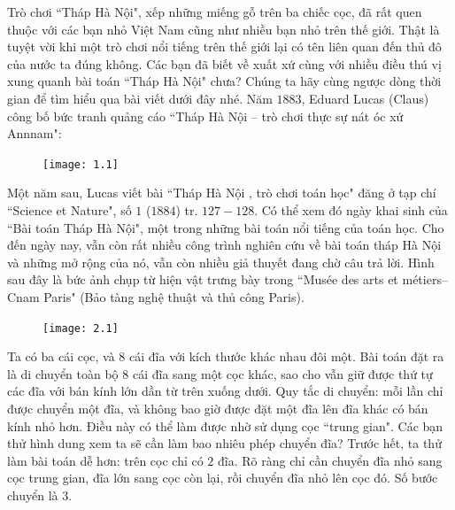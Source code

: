 \begin{multicols}{2}
	Trò chơi ``Tháp Hà Nội", xếp những miếng gỗ trên ba chiếc cọc, đã rất quen thuộc với các bạn nhỏ Việt Nam cũng như nhiều bạn nhỏ trên thế giới. Thật là tuyệt vời khi một trò chơi nổi tiếng trên thế giới lại có tên liên quan đến thủ đô của nước ta đúng không. Các bạn đã biết về xuất xứ cùng với nhiều điều thú vị xung quanh bài toán ``Tháp Hà Nội" chưa? Chúng ta hãy cùng ngược dòng thời gian để tìm hiểu qua bài viết dưới đây nhé.
	\vskip 0.1cm
	Năm $1883$, Eduard Lucas (Claus) công bố  bức tranh quảng cáo ``Tháp Hà Nội --  trò chơi thực sự nát óc xứ Annnam":
	\begin{figure}[H]
		\centering
		\vspace*{-5pt}
		\captionsetup{labelformat= empty, justification=centering}
		\texttt{[image: 1.1]}
		\vspace*{-15pt}
	\end{figure}
	Một năm sau, Lucas viết bài ``Tháp Hà Nội , trò chơi toán học" đăng ở tạp chí ``Science et Nature", số $1$ ($1884$) tr. $127-128$. Có thể xem đó ngày khai sinh của ``Bài toán Tháp Hà Nội", một trong những bài toán nổi tiếng của toán học. Cho đến ngày nay, vẫn còn rất nhiều công trình nghiên cứu về bài toán tháp Hà Nội và những mở rộng của nó, vẫn còn nhiều giả thuyết đang chờ câu trả lời.
	\vskip 0.1cm
	Hình sau đây là bức ảnh chụp từ hiện vật trưng bày trong ``Musée des arts et métiers--Cnam Paris" (Bảo tàng nghệ thuật và thủ công Paris). 
	\begin{figure}[H]
		\centering
		\vspace*{-5pt}
		\captionsetup{labelformat= empty, justification=centering}
		\texttt{[image: 2.1]}
		\vspace*{-15pt} 
	\end{figure}
	Ta có ba cái cọc, và  $8$ cái đĩa với kích thước khác nhau đôi một. Bài toán đặt ra là di chuyển toàn bộ $8$ cái đĩa sang một cọc khác, sao cho vẫn giữ được thứ tự các đĩa với bán kính lớn dần từ trên xuống dưới. Quy tắc di chuyển: mỗi lần chỉ được chuyển một đĩa, và không bao giờ được đặt một đĩa lên đĩa khác có bán kính nhỏ hơn. Điều này có thể làm được nhờ sử dụng cọc ``trung gian".
	\vskip 0.1cm
	Các bạn thử hình dung xem ta sẽ cần làm bao nhiêu phép chuyển đĩa?
	\vskip 0.1cm
	Trước hết, ta thử làm bài toán dễ hơn: trên cọc chỉ có $2$ đĩa. Rõ ràng chỉ cần chuyển đĩa nhỏ sang cọc trung gian, đĩa lớn sang cọc còn lại, rồi chuyển đĩa nhỏ lên cọc đó. Số bước chuyển là $3$.

\end{multicols}

